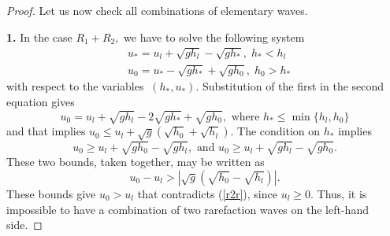 \documentclass[10pt,a4paper]{amsart}
\begin{document}
\begin{proof}
Let us now check all combinations of elementary waves.

\noindent \textbf{1.}
In the case $R_{1} + R_{2}, $ we have to solve the following   system
\begin{equation*}
\begin{split}
& u_{\ast} = u_{l} + \sqrt{gh_{l}} - \sqrt{gh_{\ast}},\; h_{\ast}< h_{l} \\
& u_{0} = u_{\ast} - \sqrt{gh_{\ast}} + \sqrt{gh_{0}},\; h_{0}>h_{\ast}
\end{split}
\end{equation*}
with respect to the variables \(\ (h_{\ast},u_{\ast})\). Substitution of the first in the
second equation gives
\[u_{0} = u_{l} + \sqrt{gh_{l}} - 2\sqrt{gh_{\ast}} + \sqrt{gh_{0}},
\text{ where } h_{\ast}\leq \min \{h_{l},h_{0}\}\]
and that implies \( u_{0} \leq u_{l} + \sqrt{g}
\left( \sqrt{h_{0}} + \sqrt{h_{l}} \right)\). 
The condition on \({h}_{\ast}\) implies
\[u_{0} \geq u_{l} + \sqrt{gh_{0}} - \sqrt{gh_{l}},\text{ and } 
u_{0} \geq u_{l} + \sqrt{gh_{l}} - \sqrt{gh_{0}}.\]
These two bounds, taken together, may be written as
\[u_{0} - u_{l} > \left| \sqrt{g}\left( \sqrt{h_{0}} 
- \sqrt{h_{l}} \right) \right|.\]
These bounds give \(u_{0} > u_{l}\) that contradicts (\ref{r2r}),
since \(u_{l} \geq 0\). Thus, it is impossible to have a combination of 
two rarefaction waves on the left-hand side.


\end{proof}
\end{document}
